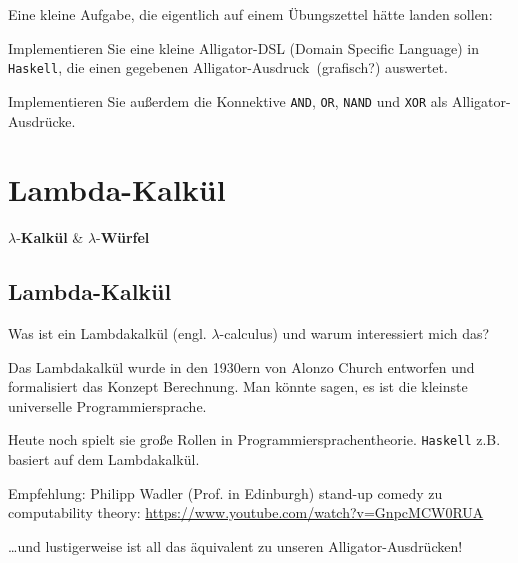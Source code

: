 \documentclass{beamer}
\begin{document}

\begin{frame}

Eine kleine Aufgabe, die eigentlich auf einem Übungszettel hätte landen sollen:\pause\bigskip

Implementieren Sie eine kleine Alligator-DSL (Domain Specific Language) in \texttt{Haskell}, die einen gegebenen \glqq Alligator-Ausdruck\grqq\ (grafisch?) auswertet.\bigskip

Implementieren Sie außerdem die Konnektive \texttt{AND}, \texttt{OR}, \texttt{NAND} und \texttt{XOR} als Alligator-Ausdrücke. 

\end{frame}

\section*{Lambda-Kalkül}

\begin{frame}

\begin{center}
\Large $\lambda$-\textbf{Kalkül} \& $\lambda$-\textbf{Würfel} \normalsize
\end{center}

\end{frame}

\subsection*{Lambda-Kalkül}

\begin{frame}
Was ist ein Lambdakalkül (engl. $\lambda$-calculus) und warum interessiert mich das?
\pause\bigskip

Das Lambdakalkül wurde in den 1930ern von Alonzo Church entworfen und formalisiert das Konzept \glqq Berechnung\grqq. Man könnte sagen, es ist die kleinste universelle Programmiersprache. 

Heute noch spielt sie große Rollen in Programmiersprachentheorie. \texttt{Haskell} z.B. basiert auf dem Lambdakalkül.\smallskip\smallskip

Empfehlung: Philipp Wadler (Prof. in Edinburgh) stand-up comedy zu computability theory:
\url{https://www.youtube.com/watch?v=GnpcMCW0RUA}

\pause\bigskip
\dots und lustigerweise ist all das äquivalent zu unseren Alligator-Ausdrücken!
\end{frame}
\end{document}
